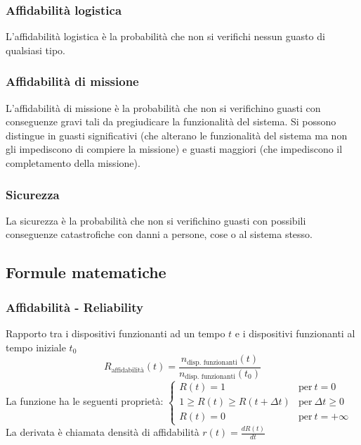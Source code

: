 \documentclass[a4paper]{article}
\begin{document}
\subsubsection*{Affidabilità logistica}
L'affidabilità logistica è la probabilità che non si verifichi nessun guasto di qualsiasi tipo.

\subsubsection*{Affidabilità di missione}
L'affidabilità di missione è la probabilità che non si verifichino guasti con conseguenze gravi tali da pregiudicare la
funzionalità del sistema. Si possono distingue in guasti significativi (che alterano le funzionalità del sistema ma non
gli impediscono di compiere la missione) e guasti maggiori (che impediscono il completamento della missione).

\subsubsection*{Sicurezza}
La sicurezza è la probabilità che non si verifichino guasti con possibili conseguenze catastrofiche con danni a persone, cose
o al sistema stesso.

\subsection{Formule matematiche}
\subsubsection*{Affidabilità - Reliability}
Rapporto tra i dispositivi funzionanti ad un tempo \(t\) e i dispositivi funzionanti al tempo iniziale \(t_0\)
\[R_\text{affidabilità}(t) = \frac{n_\text{disp. funzionanti}(t)}{n_\text{disp. funzionanti}(t_0)}\]
La funzione ha le seguenti proprietà:
\(\begin{cases}
	R(t) = 1 & \text{per}\ t = 0 \\
	1 \geq R(t) \geq R(t + \Delta t) & \text{per}\ \Delta t \geq 0 \\
	R(t) = 0 & \text{per}\ t = +\infty
\end{cases}\) \\[10pt]
La derivata è chiamata densità di affidabilità \(\displaystyle r(t) = \frac{dR(t)}{dt}\)
\end{document}
